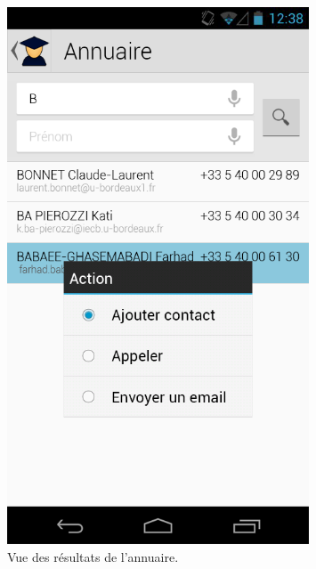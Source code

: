 \documentclass [pdftex,12pt] {report}
\begin{document}
\begin{figure}
\begin{minipage}[t]{8cm}
    \includegraphics[width=0.8\textwidth]{resources/ui_preview/08}
    \caption{Vue des résultats de l'annuaire.}
    \label{fig:08}
  \end{minipage}
  \hspace{-60pt}
\end{figure}
\end{document}
